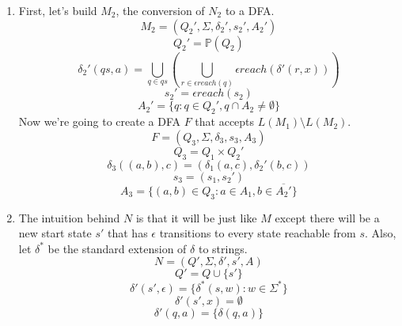 \documentclass[11pt]{article}
\begin{document}
\begin{solution}
    \begin{enumerate}
        \item First, let's build $M_2$, the conversion of $N_2$ to a DFA.
            \[
                M_2 = (Q_2', \Sigma, \delta_2', s_2', A_2')
            \]
            \[
                Q_2' = \mathbb{P}(Q_2)
            \]
            \[
                \delta_2'(qs, a) = \bigcup_{q \in qs}\left(\bigcup_{r \in \epsilon reach(q)} \epsilon reach(\delta'(r, x))\right)
            \]
            \[
                s_2' = \epsilon reach(s_2)
            \]
            \[
                A_2' = \{q : q \in Q_2', q \cap A_2 \neq \emptyset \}
            \]
            Now we're going to create a DFA $F$ that accepts $L(M_1) \setminus L(M_2)$.
            \[
                F = (Q_3, \Sigma, \delta_3, s_3, A_3)
            \]
            \[
                Q_3 = Q_1 \times Q_2'
            \]
            \[
                \delta_3((a,b),c) = (\delta_1(a, c), \delta_2'(b,c))
            \]
            \[
                s_3 = (s_1, s_2')
            \]
            \[
                A_3 = \{(a, b) \in Q_3 : a \in A_1, b \in \overline{A_2'}\}
            \]
        \item The intuition behind $N$ is that it will be just like $M$ except there will be a new start state $s'$ that has $\epsilon$ transitions to every state reachable from $s$. Also, let $\delta^*$ be the standard extension of $\delta$ to strings.
            \[
                N = (Q', \Sigma, \delta', s',A)
            \]
            \[
                Q' = Q \cup \{s'\}
            \]
            \[
                \delta'(s', \epsilon) = \{\delta^*(s, w) : w \in \Sigma^*\}
            \]
            \[
                \delta'(s', x) = \emptyset
            \]
            \[
                \delta'(q, a) = \{\delta(q, a)\}
            \]
    \end{enumerate}
\end{solution}
\end{document}
